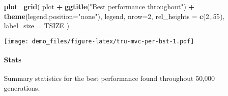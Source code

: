 \documentclass[]{book}
\newenvironment{Shaded}{\begin{snugshade}}{\end{snugshade}}
\newcommand{\DataTypeTok}[1]{\textcolor[rgb]{0.13,0.29,0.53}{#1}}
\newcommand{\DecValTok}[1]{\textcolor[rgb]{0.00,0.00,0.81}{#1}}
\newcommand{\KeywordTok}[1]{\textcolor[rgb]{0.13,0.29,0.53}{\textbf{#1}}}
\newcommand{\NormalTok}[1]{#1}
\newcommand{\OperatorTok}[1]{\textcolor[rgb]{0.81,0.36,0.00}{\textbf{#1}}}
\newcommand{\OtherTok}[1]{\textcolor[rgb]{0.56,0.35,0.01}{#1}}
\newcommand{\StringTok}[1]{\textcolor[rgb]{0.31,0.60,0.02}{#1}}
\let\oldparagraph\paragraph
\renewcommand{\paragraph}[1]{\oldparagraph{#1}\mbox{}}
\begin{document}
\begin{Shaded}
\begin{Highlighting}[]
\KeywordTok{plot_grid}\NormalTok{(}
\NormalTok{  plot }\OperatorTok{+}
\StringTok{    }\KeywordTok{ggtitle}\NormalTok{(}\StringTok{"Best performance throughout"}\NormalTok{) }\OperatorTok{+}
\StringTok{    }\KeywordTok{theme}\NormalTok{(}\DataTypeTok{legend.position=}\StringTok{"none"}\NormalTok{),}
\NormalTok{  legend,}
  \DataTypeTok{nrow=}\DecValTok{2}\NormalTok{,}
  \DataTypeTok{rel_heights =} \KeywordTok{c}\NormalTok{(}\DecValTok{2}\NormalTok{,.}\DecValTok{55}\NormalTok{),}
  \DataTypeTok{label_size =}\NormalTok{ TSIZE}
\NormalTok{)}
\end{Highlighting}
\end{Shaded}

\texttt{[image: demo\_files/figure-latex/tru-mvc-per-bst-1.pdf]}

\hypertarget{stats-25}{%
\paragraph{Stats}\label{stats-25}}

Summary statistics for the best performance found throughout 50,000 generations.

\begin{Shaded}
\end{Shaded}
\end{document}
